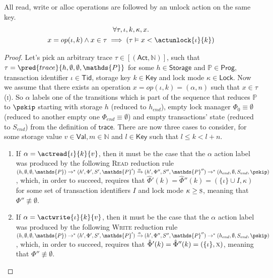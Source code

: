 \lem \label{lem:unlock} All read, write or alloc operations are followed by an unlock action on the same key.
\begin{gather*}
	\forall \tau, \iota, k, \kappa, x \ldotp \\
	x = op(\iota, k) \land x \in \tau \implies \left( \tau \vDash x < \actunlock{\iota}{k} \right)
\end{gather*}

\begin{proof}
Let's pick an arbitrary trace $\tau \in \mathsf{[(Act, \mathds{N})]}$, such that $\tau = \pred{trace}{h, \emptyset, \emptyset, \mathds{P}}$ for some $h \in \mathsf{Storage}$ and $\mathds{P} \in \mathsf{Prog}$, transaction identifier $\iota \in \mathsf{Tid}$, storage key $k \in \mathsf{Key}$ and lock mode $\kappa \in \mathsf{Lock}$. Now we assume that there exists an operation $x = op(\iota, k) = (\alpha, n)$ such that $x \in \tau$ (\textsc{i}). So $\alpha$ labels one of the transitions which is part of the sequence that reduces $\mathds{P}$ to $\pskip$ starting with storage $h$ (reduced to $h_{end}$), empty lock manager $\Phi_0 \equiv \emptyset$ (reduced to another empty one $\Phi_{end} \equiv \emptyset$) and empty transactions' state (reduced to $S_{end}$) from the definition of $\mathsf{trace}$. There are now three cases to consider, for some storage value $v \in \mathsf{Val}, m \in \mathds{N}$ and $l \in \mathsf{Key}$ such that $l \leq k < l + n$.
\begin{enumerate}
	\item If $\alpha = \actread{\iota}{k}{v}$, then it must be the case that the $\alpha$ action label was produced by the following \textsc{Read} reduction rule $(h, \emptyset, \emptyset, \mathds{P}) \rightarrow^* (h', \Phi', S', \mathds{P}') \xrightarrow{\alpha} (h', \Phi'', S'', \mathds{P}'') \rightarrow^* (h_{end}, \emptyset, S_{end}, \pskip)$, which, in order to succeed, requires that $\hat{\Phi}'(k) = \hat{\Phi}''(k) = (\{ \iota \} \cup I, \kappa)$ for some set of transaction identifiers $I$ and lock mode $\kappa \geq \textsc{s}$, meaning that $\Phi'' \not\equiv \emptyset$.
	
	\item If $\alpha = \actwrite{\iota}{k}{v}$, then it must be the case that the $\alpha$ action label was produced by the following \textsc{Write} reduction rule $(h, \emptyset, \emptyset, \mathds{P}) \rightarrow^* (h', \Phi', S', \mathds{P}') \xrightarrow{\alpha} (h', \Phi'', S'', \mathds{P}'') \rightarrow^* (h_{end}, \emptyset, S_{end}, \pskip)$, which, in order to succeed, requires that $\hat{\Phi}'(k) = \hat{\Phi}''(k) = (\{ \iota \}, \textsc{x})$, meaning that $\Phi'' \not\equiv \emptyset$.
	

\end{enumerate}
\end{proof}
